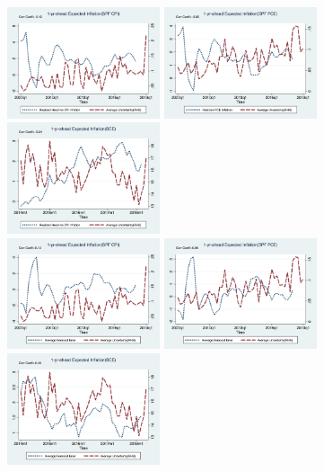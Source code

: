 \documentclass[]{article}
\begin{document}
\begin{figure}[ht]
	\centering
	\smallskip
	\includegraphics[width=4.5cm]{figures/Inf1yf_CPIAU_varSPFCPIQ.png}
	\includegraphics[width=4.5cm]{figures/Inf1yf_PCE_varSPFPCEQ.png}
		\includegraphics[width=4.5cm]{figures/Inf1yf_CPIAU_varSCEM.png}\\
	  	\smallskip
		\includegraphics[width=4.5cm]{figures/SPFCPI_FE_varSPFCPIQ.png}
	\includegraphics[width=4.5cm]{figures/SPFPCE_FE_varSPFPCEQ.png}
		\includegraphics[width=4.5cm]{figures/SCE_FE_varSCEM.png}\\

\end{figure}
\end{document}
